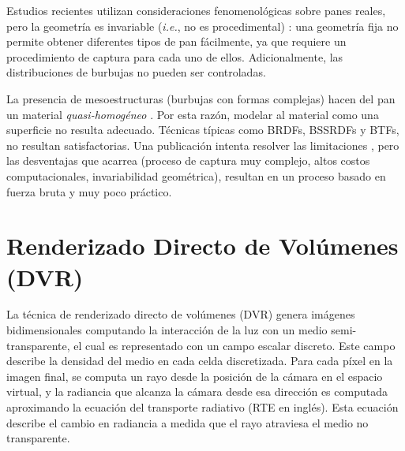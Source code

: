 Estudios recientes utilizan consideraciones fenomenológicas sobre panes reales, pero la geometría es invariable ({\em i.e.}, no es procedimental) \cite{VanDyck2014}: una geometría fija no permite obtener diferentes tipos de pan fácilmente, ya que requiere un procedimiento de captura para cada uno de ellos.
Adicionalmente, las distribuciones de burbujas no pueden ser controladas.

La presencia de mesoestructuras (burbujas con formas complejas) hacen del pan un material {\em quasi-homogéneo} \cite{Tong2005}. 
Por esta razón, modelar al material como una superficie no resulta adecuado.
Técnicas típicas como BRDFs, BSSRDFs \cite{Donner2009} y BTFs, no resultan satisfactorias.
Una publicación intenta resolver las limitaciones \cite{Tong2005}, pero las desventajas que acarrea (proceso de captura muy complejo, altos costos computacionales, invariabilidad geométrica), resultan en un proceso basado en fuerza bruta y muy poco práctico.




\section{Renderizado Directo de Volúmenes (DVR)}

La técnica de renderizado directo de volúmenes (DVR) \cite{Kratz2006} genera imágenes bidimensionales computando la interacción de la luz con un medio semi-transparente, el cual es representado con un campo escalar discreto.
Este campo describe la densidad del medio en cada celda discretizada.
Para cada píxel en la imagen final, se computa un rayo desde la posición de la cámara en el espacio virtual, y la radiancia que alcanza la cámara desde esa dirección es computada aproximando la ecuación del transporte radiativo (RTE en inglés).
Esta ecuación describe el cambio en radiancia a medida que el rayo atraviesa el medio no transparente.

